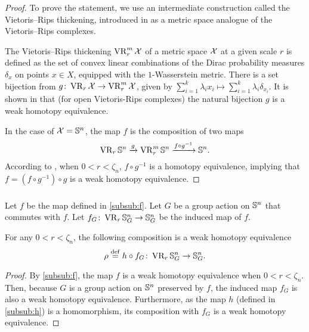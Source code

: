 \begin{proof}
	To prove the statement, we use an intermediate construction called the Vietoris--Rips thickening, introduced in \cite{adamaszek2018metric} as a metric space analogue of the Vietoris--Rips complexes.

	The Vietoris--Rips thickening $\operatorname{VR}_r^m\mathcal{X}$ of a metric space $\mathcal{X}$ at a given scale $r$ is defined as the set of convex linear combinations of the Dirac probability measures $\delta_{x}$ on points $x \in X$, equipped with the $1$-Wasserstein metric.
	There is a set bijection from $g \colon \operatorname{VR}_r\mathcal{X} \to \operatorname{VR}_r^m\mathcal{X}$, given by $\sum_{i=1}^k\lambda_i x_i\mapsto \sum_{i=1}^k\lambda_i\delta_{x_i}.$
	It is shown in \cite[Theorem 1]{gillespie2024vietoris} that (for open Vietoris-Rips complexes) the natural bijection $g$ is a weak homotopy equivalence.

	In the case of $\mathcal{X} = \mathbb{S}^n$, the map $f$ is the composition of two maps
	\[\operatorname{VR}_r\mathbb{S}^n\xrightarrow{g}\operatorname{VR}_r^m\mathbb{S}^n\xrightarrow{f \circ g^{-1}}\mathbb{S}^n.\]
	According to \cite[Proposition 5.3]{adamaszek2018metric}, when $0<r<\zeta_n$, $f \circ g^{-1}$ is a homotopy equivalence, implying that $f = (f \circ g^{-1}) \circ g$ is a weak homotopy equivalence.
\end{proof}

\subsubsection{}
\label{subsub:rho}
Let $f$ be the map defined in \cref{subsub:f}.
Let $G$ be a group action on $\mathbb{S}^n$ that commutes with $f$.
Let $f_G \colon \operatorname{VR}_r\mathbb{S}^n_G \to \mathbb{S}^n_G$ be the induced map of $f$.

\medskip\lemma
For any $0<r<\zeta_n$, the following composition is a weak homotopy equivalence
\[
\rho \stackrel{\mathrm{def}}{=} h \circ f_G
\colon \operatorname{VR}_r\mathbb{S}^n_G \to \mathbb{S}^n_G.
\]
\begin{proof}
	By \cref{subsub:f}, the map $f$ is a weak homotopy equivalence when $0<r<\zeta_n$.
	Then, because $G$ is a group action on $\mathbb{S}^n$ preserved by $f$, the induced map $f_G$ is also a weak homotopy equivalence.
	Furthermore, as the map $h$ (defined in \cref{subsub:h}) is a homomorphism, its composition with $f_G$ is a weak homotopy equivalence.
\end{proof}

\subsubsection{}

